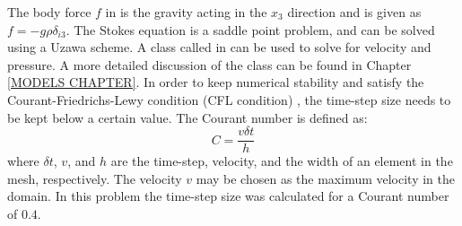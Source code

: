 %
%
%
The body force $f$ in  is the gravity acting in
the $x_{3}$ direction and is given as $f=-g\rho\delta_{i3}$.
The Stokes equation is a saddle point problem, and can be solved using a Uzawa scheme.
A class called  in \escript can be used to solve
for velocity and pressure. A more detailed discussion of the class can be
found in Chapter \ref{MODELS CHAPTER}.
In order to keep numerical stability and satisfy the Courant-Friedrichs-Lewy condition (CFL condition)  , the
time-step size needs to be kept below a certain value.
The Courant number  is defined as:
%
\begin{equation}
C = \frac{v \delta t}{h}
\label{COURANT}
\end{equation}
%
where $\delta t$, $v$, and $h$ are the time-step, velocity, and the width of
an element in the mesh, respectively. The velocity $v$ may be chosen as the
maximum velocity in the domain. In this problem the time-step size was
calculated for a Courant number of $0.4$.

